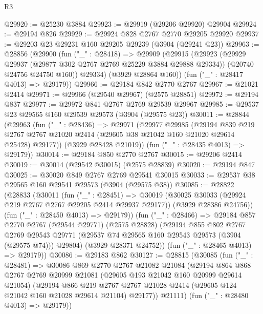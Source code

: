 \begin{lexlean}{R3}
\begin{coremodule}
@29920 := @25230 @3884
@29923 := @29919 (@29206 @29920) @29904
@29924 := @29194 @826
@29929 := @29924 @828 @2767 @2770 @29205 @29920
@29937 := @29203 @23 @29231 @160 @29205 @29239 (@3904 (@29241 @23))
@29963 := @28856
    (@29900
      (fun ("_" : @28418) =>
      @29909
        (@29915
          (@29923
            (@29929 @29937 (@29877 @302 @2767 @2769 @25229 @3884 @29888 @29334))
            (@20740 @24756 @24750 @160))
          @29334)
        (@3929 @28864 @160))
      (fun ("_" : @28417 @4013) => @29179))
@29966 := @29184 @842 @2770 @2767
@29967 := @21021 @2414
@29971 := @29966 (@29540 @29967) (@2575 @28851)
@29972 := @29194 @837
@29977 := @29972 @841 @2767 @2769 @29539 @29967
@29985 := @29537 @23 @29565 @160 @29539 @29573 (@3904 (@29575 @23))
@30011 := @28844
    (@29963
      (fun ("_" : @28436) =>
      @29971
        (@29977
          @29985
          (@29194
            @839
            @219
            @2767
            @2767
            @21020
            @2414
            (@29605 @38 @21042 @160 @21020 @29614 @25428)
            @29177))
        (@3929 @28428 @21019))
      (fun ("_" : @28435 @4013) => @29179))
@30014 := @29184 @850 @2770 @2767
@30015 := @29206 @2414
@30019 := @30014 (@29542 @30015) (@2575 @28839)
@30020 := @29194 @847
@30025 := @30020 @849 @2767 @2769 @29541 @30015
@30033 := @29537 @38 @29565 @160 @29541 @29573 (@3904 (@29575 @38))
@30085 := @28822
    (@28833
      (@30011
        (fun ("_" : @28451) =>
        @30019
          (@30025 @30033 (@29924 @219 @2767 @2767 @29205 @2414 @29937 @29177))
          (@3929 @28386 @24756))
        (fun ("_" : @28450 @4013) => @29179))
      (fun ("_" : @28466) =>
      @29184
        @857
        @2770
        @2767
        (@29544 @29771)
        (@2575 @28828)
        (@29194
          @855
          @802
          @2767
          @2769
          @29543
          @29771
          (@29537 @74 @29565 @160 @29543 @29573 (@3904 (@29575 @74)))
          @29804)
        (@3929 @28371 @24752))
      (fun ("_" : @28465 @4013) => @29179))
@30086 := @29183 @862
@30127 := @28815
    (@30085
      (fun ("_" : @28481) =>
      @30086
        @869
        @2770
        @2767
        @21082
        @21084
        (@29194
          @864
          @868
          @2767
          @2769
          @20999
          @21081
          (@29605 @193 @21042 @160 @20999 @29614 @21054)
          (@29194
            @866
            @219
            @2767
            @2767
            @21028
            @2414
            (@29605 @124 @21042 @160 @21028 @29614 @21104)
            @29177))
        @21111)
      (fun ("_" : @28480 @4013) => @29179))

\end{coremodule}
\end{lexlean}
